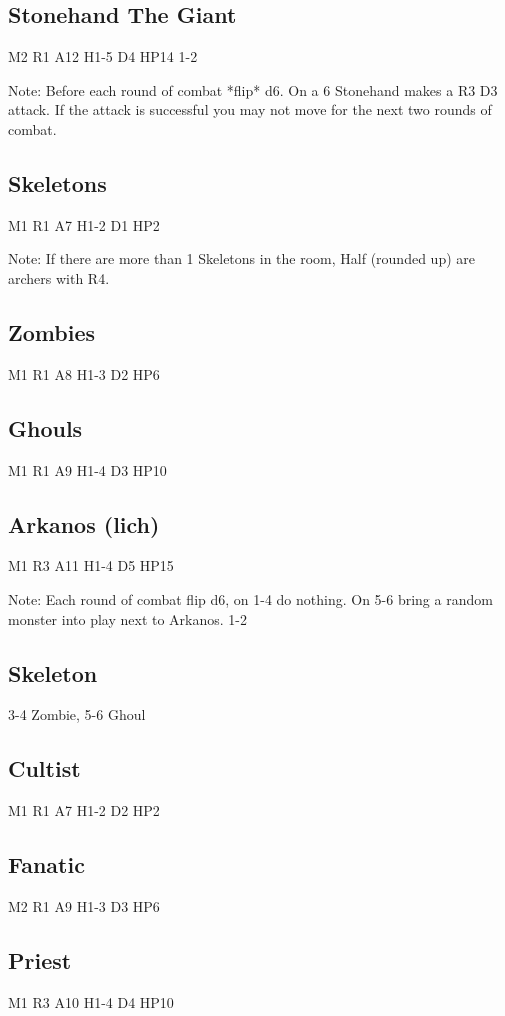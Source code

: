 \documentclass[a6paper,hidelinks]{article}
\begin{document}
\subsection{Stonehand The Giant}
M2 R1 A12 H1-5 D4 HP14 1-2

Note: Before each round of combat *flip* d6. On a 6 Stonehand makes a R3 D3 attack. If the attack is successful you may not move for the next two rounds of combat.

\subsection{Skeletons}
M1 R1 A7 H1-2 D1 HP2

Note: If there are more than 1 Skeletons in the room, Half (rounded up) are archers with R4.

\subsection{Zombies}
M1 R1 A8 H1-3 D2 HP6

\subsection{Ghouls}
M1 R1 A9 H1-4 D3 HP10

\subsection{Arkanos (lich)}
M1 R3 A11 H1-4 D5 HP15

Note: Each round of combat flip d6, on 1-4 do nothing. On 5-6 bring a random 
monster into play next to Arkanos. 1-2

\subsection{Skeleton}
3-4 Zombie, 5-6 Ghoul

\subsection{Cultist}
M1 R1 A7 H1-2 D2 HP2

\subsection{Fanatic}
M2 R1 A9 H1-3 D3 HP6

\subsection{Priest}
M1 R3 A10 H1-4 D4 HP10
\end{document}
